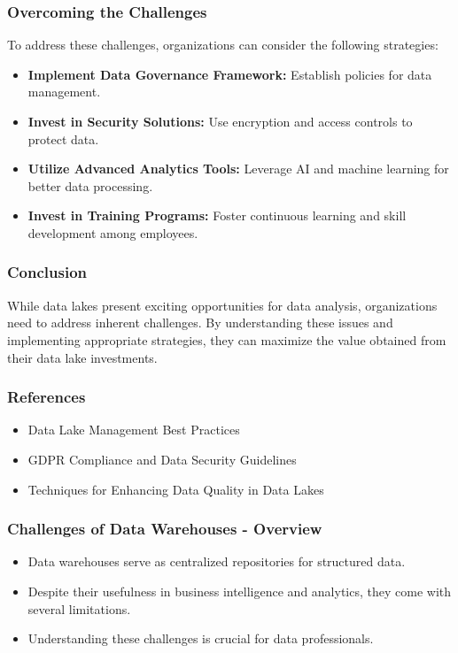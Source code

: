 \documentclass[aspectratio=169]{beamer}
\begin{document}
\begin{frame}[fragile]
    \frametitle{Overcoming the Challenges}
    To address these challenges, organizations can consider the following strategies:
    \begin{itemize}
        \item \textbf{Implement Data Governance Framework:} Establish policies for data management.
        \item \textbf{Invest in Security Solutions:} Use encryption and access controls to protect data.
        \item \textbf{Utilize Advanced Analytics Tools:} Leverage AI and machine learning for better data processing.
        \item \textbf{Invest in Training Programs:} Foster continuous learning and skill development among employees.
    \end{itemize}
\end{frame}

\begin{frame}[fragile]
    \frametitle{Conclusion}
    While data lakes present exciting opportunities for data analysis, organizations need to address inherent challenges. By understanding these issues and implementing appropriate strategies, they can maximize the value obtained from their data lake investments.
\end{frame}

\begin{frame}[fragile]
    \frametitle{References}
    \begin{itemize}
        \item Data Lake Management Best Practices
        \item GDPR Compliance and Data Security Guidelines
        \item Techniques for Enhancing Data Quality in Data Lakes
    \end{itemize}
\end{frame}

\begin{frame}[fragile]
    \frametitle{Challenges of Data Warehouses - Overview}
    \begin{itemize}
        \item Data warehouses serve as centralized repositories for structured data.
        \item Despite their usefulness in business intelligence and analytics, they come with several limitations.
        \item Understanding these challenges is crucial for data professionals.
    \end{itemize}
\end{frame}
\end{document}

